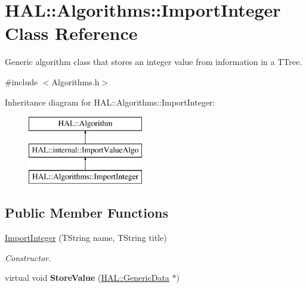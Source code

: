 \hypertarget{class_h_a_l_1_1_algorithms_1_1_import_integer}{\section{H\+A\+L\+:\+:Algorithms\+:\+:Import\+Integer Class Reference}
\label{class_h_a_l_1_1_algorithms_1_1_import_integer}
}


Generic algorithm class that stores an integer value from information in a T\+Tree.  




{\ttfamily \#include $<$Algorithms.\+h$>$}

Inheritance diagram for H\+A\+L\+:\+:Algorithms\+:\+:Import\+Integer\+:\begin{figure}[H]
\begin{center}
\leavevmode
\includegraphics[height=3.000000cm]{class_h_a_l_1_1_algorithms_1_1_import_integer}
\end{center}
\end{figure}
\subsection*{Public Member Functions}
\begin{DoxyCompactItemize}
\item 
\hyperlink{class_h_a_l_1_1_algorithms_1_1_import_integer_a9dbe511f3ff1a3bf1d9a0de66f08da34}{Import\+Integer} (T\+String name, T\+String title)
\begin{DoxyCompactList}\small\item\em Constructor. \end{DoxyCompactList}\item 
\hypertarget{class_h_a_l_1_1_algorithms_1_1_import_integer_a182865e798de3856a85e4339155b8a7f}{virtual void {\bfseries Store\+Value} (\hyperlink{class_h_a_l_1_1_generic_data}{H\+A\+L\+::\+Generic\+Data} $\ast$)}\label{class_h_a_l_1_1_algorithms_1_1_import_integer_a182865e798de3856a85e4339155b8a7f}

\end{DoxyCompactItemize}


